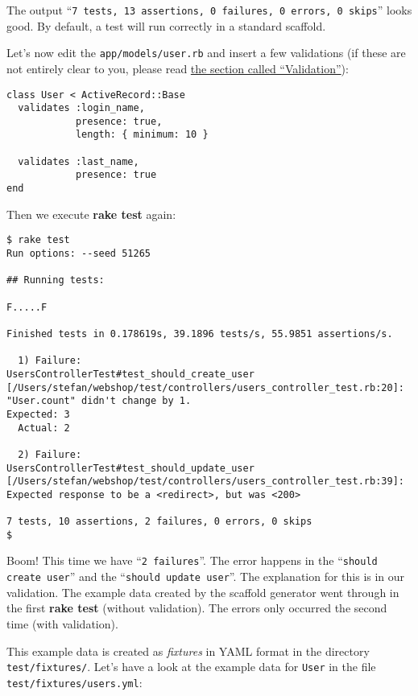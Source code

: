 \documentclass[a4paper]{book}
\begin{document}
The output “\texttt{7 tests, 13 assertions, 0 failures, 0 errors, 0     skips}” looks good. By default, a test will run correctly in a standard scaffold.

Let's now edit the \texttt{app/models/user.rb} and insert a few validations (if these are not entirely clear to you, please read \hyperref[activerecordux5fvalidation]{the section called “Validation”}):

\begin{shaded}\begin{verbatim}
class User < ActiveRecord::Base
  validates :login_name,
            presence: true,
            length: { minimum: 10 }

  validates :last_name,
            presence: true
end
\end{verbatim}\end{shaded}

Then we execute \textbf{rake test} again:

\begin{shaded}\begin{verbatim}
$ rake test
Run options: --seed 51265

## Running tests:

F.....F

Finished tests in 0.178619s, 39.1896 tests/s, 55.9851 assertions/s.

  1) Failure:
UsersControllerTest#test_should_create_user [/Users/stefan/webshop/test/controllers/users_controller_test.rb:20]:
"User.count" didn't change by 1.
Expected: 3
  Actual: 2

  2) Failure:
UsersControllerTest#test_should_update_user [/Users/stefan/webshop/test/controllers/users_controller_test.rb:39]:
Expected response to be a <redirect>, but was <200>

7 tests, 10 assertions, 2 failures, 0 errors, 0 skips
$
\end{verbatim}\end{shaded}

Boom! This time we have “\texttt{2 failures}”. The error happens in the “\texttt{should create user}” and the “\texttt{should update user}”. The explanation for this is in our validation. The example data created by the scaffold generator went through in the first \textbf{rake test} (without validation). The errors only occurred the second time (with validation).

This example data is created as \emph{fixtures} in YAML format in the directory \texttt{test/fixtures/}. Let's have a look at the example data for \texttt{User} in the file \texttt{test/fixtures/users.yml}:
\end{document}
